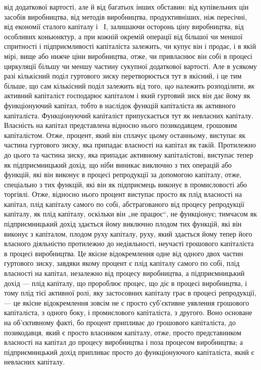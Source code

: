 \parcont{}  %
від додаткової вартості, але й від багатьох інших обставин: від
купівельних цін засобів виробництва, від методів виробництва,
продуктивніших, ніж пересічні, від економії сталого капіталу
і~ І, залишаючи осторонь ціну виробництва, від особливих
коньюнктур, а при кожній окремій операції від більшої чи меншої
спритності і підприємливості капіталіста залежить, чи купує
він і продає, і в якій мірі, вище або нижче ціни виробництва,
отже, чи привласнює він собі в процесі циркуляції більшу чи
меншу частину сукупної додаткової вартості. Але в усякому разі
кількісний поділ гуртового зиску перетворюється тут в якісний,
і це тим більше, що сам кількісний поділ залежить від того, \emph{що}
належить розподілити, \emph{як} активний капіталіст господарює капіталом
і який гуртовий зиск він дає йому як функціонуючий капітал,
тобто в наслідок функцій капіталіста як активного капіталіста.
Функціонуючий капіталіст припускається тут як невласних капіталу.
Власність на капітал представлена відносно нього позикодавцем,
грошовим капіталістом. Отже, процент, який він
сплачує цьому останньому, виступає як частина гуртового зиску,
яка припадає власності на капітал як такій. Протилежно до
цього та частина зиску, яка припадає активному капіталістові,
виступає тепер як підприємницький дохід, що ніби виникає виключно
з тих операцій або функцій, які він виконує в процесі
репродукції за допомогою капіталу, отже, спеціально з тих функцій,
які він як підприємець виконує в промисловості або торгівлі.
Отже, відносно нього процент виступає просто як плід власності
на капітал, плід капіталу самого по собі, абстрагованого від процесу
репродукції капіталу, як плід капіталу, оскільки він „не працює“,
не функціонує; тимчасом як підприємницький дохід здається
йому виключно плодом тих функцій, які він виконує з капіталом,
плодом руху капіталу, руху, який здається йому тепер його
власного діяльністю протилежно до недіяльності, неучасті грошового
капіталіста в процесі виробництва. Це якісне відокремлення
одне від одного двох частин гуртового зиску, завдяки якому
процент є плід капіталу самого по собі, плід власності на капітал,
незалежно від процесу виробництва, а підприємницький
дохід — плід капіталу, що пророблює процес, що діє в процесі
виробництва, і тому плід тієї активної ролі, яку застосовних
капіталу грає в процесі репродукції, — це якісне відокремлення
зовсім не є просто суб’єктивне уявлення грошового капіталіста,
з одного боку, і промислового капіталіста, з другого. Воно
основане на об’єктивному факті, бо процент припливає до грошового
капіталіста, до позикодавця, який є просто власником
капіталу, отже, просто представником власності на капітал до
процесу виробництва і поза процесом виробництва; а підприємницький
дохід припливає просто до функціонуючого капіталіста,
який є невласних капіталу.


